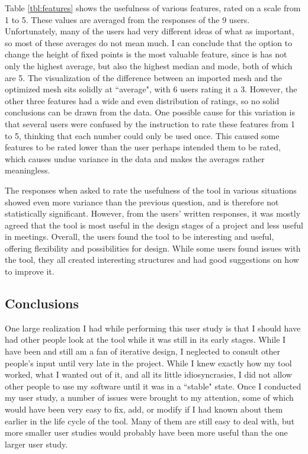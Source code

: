 \documentclass{thesis}
\begin{document}
Table \ref{tbl:features} shows the usefulness of various features, rated on a scale from 1 to 5.  These values are averaged from
the responses of the 9 users.  Unfortunately, many of the users had very different ideas of what as important, so most of these
averages do not mean much.  I can conclude that the option to change the height of fixed points is the most valuable feature,
since is has not only the highest average, but also the highest median and mode, both of which are 5.  The visualization of the
difference between an imported mesh and the optimized mesh sits solidly at ``average", with 6 users rating it a 3.  However, the
other three features had a wide and even distribution of ratings, so no solid conclusions can be drawn from the data.  One
possible cause for this variation is that several users were confused by the instruction to rate these features from 1 to 5,
thinking that each number could only be used once.  This caused some features to be rated lower than the user perhaps intended
them to be rated, which causes undue variance in the data and makes the averages rather meaningless.

The responses when asked to rate the usefulness of the tool in various situations showed even more variance than the previous
question, and is therefore not statistically significant.  However, from the users' written responses, it was mostly agreed
that the tool is most useful in the design stages of a project and less useful in meetings.  Overall, the users found the tool
to be interesting and useful, offering flexibility and possibilities for design.  While some users found issues with the tool,
they all created interesting structures and had good suggestions on how to improve it.

\subsection{Conclusions}
One large realization I had while performing this user study is that I should have had other people look at the tool while it
was still in its early stages.  While I have been and still am a fan of iterative design, I neglected to consult other people's
input until very late in the project.  While I knew exactly how my tool worked, what I wanted out of it, and all its little
idiosyncrasies, I did not allow other people to use my software until it was in a ``stable" state.  Once I conducted my user study,
a number of issues were brought to my attention, some of which would have been very easy to fix, add, or modify if I had known
about them earlier in the life cycle of the tool.  Many of them are still easy to deal with, but more smaller user studies
would probably have been more useful than the one larger user study.
\end{document}
